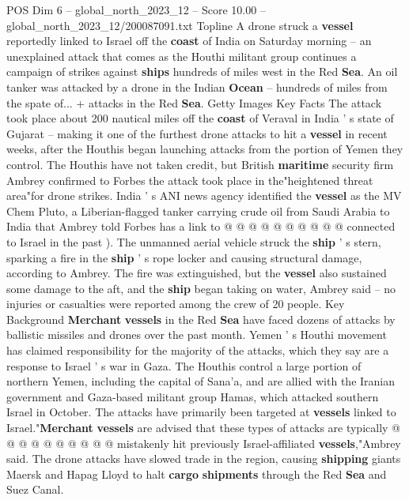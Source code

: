 \begin{textsample}{POS Dim 6 – global\_north\_2023\_12 – Score 10.00 – global\_north\_2023\_12/200087091.txt}  \label{ex:f6_pos_181}
Topline A drone struck a \textbf{vessel} reportedly linked to Israel off the \textbf{coast} of India on Saturday morning -- an unexplained attack that comes as the Houthi militant group continues a campaign of strikes against \textbf{ships} hundreds of miles west in the Red \textbf{Sea}.
An oil tanker was attacked by a drone in the Indian \textbf{Ocean} -- hundreds of miles from the spate of... + attacks in the Red \textbf{Sea}.
Getty Images Key Facts The attack took place about 200 nautical miles off the \textbf{coast} of Veraval in India ' s state of Gujarat -- making it one of the furthest drone attacks to hit a \textbf{vessel} in recent weeks, after the Houthis began launching attacks from the portion of Yemen they control.
The Houthis have not taken credit, but British \textbf{maritime} security firm Ambrey confirmed to Forbes the attack took place in the"heightened threat area"for drone strikes.
India ' s ANI news agency identified the \textbf{vessel} as the MV Chem Pluto, a Liberian-flagged tanker carrying crude oil from Saudi Arabia to India that Ambrey told Forbes has a link to @ @ @ @ @ @ @ @ @ @ connected to Israel in the past ).
The unmanned aerial vehicle struck the \textbf{ship} ' s stern, sparking a fire in the \textbf{ship} ' s rope locker and causing structural damage, according to Ambrey.
The fire was extinguished, but the \textbf{vessel} also sustained some damage to the aft, and the \textbf{ship} began taking on water, Ambrey said -- no injuries or casualties were reported among the crew of 20 people.
Key Background \textbf{Merchant} \textbf{vessels} in the Red \textbf{Sea} have faced dozens of attacks by ballistic missiles and drones over the past month.
Yemen ' s Houthi movement has claimed responsibility for the majority of the attacks, which they say are a response to Israel ' s war in Gaza.
The Houthis control a large portion of northern Yemen, including the capital of Sana'a, and are allied with the Iranian government and Gaza-based militant group Hamas, which attacked southern Israel in October.
The attacks have primarily been targeted at \textbf{vessels} linked to Israel."\textbf{Merchant} \textbf{vessels} are advised that these types of attacks are typically @ @ @ @ @ @ @ @ @ @ mistakenly hit previously Israel-affiliated \textbf{vessels},"Ambrey said.
The drone attacks have slowed trade in the region, causing \textbf{shipping} giants Maersk and Hapag Lloyd to halt \textbf{cargo} \textbf{shipments} through the Red \textbf{Sea} and Suez Canal.

\end{textsample}
